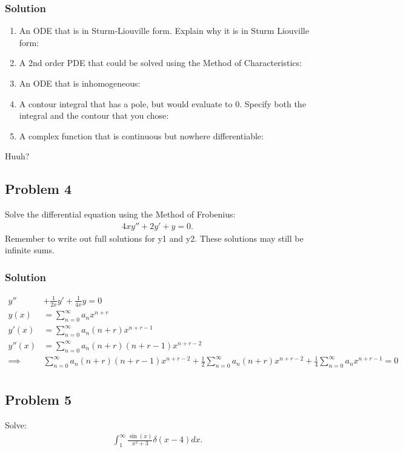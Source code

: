 \subsubsection*{Solution}
\begin{enumerate}
    \item An ODE that is in Sturm-Liouville form. Explain why it is in Sturm Liouville form:
    \item A 2nd order PDE that could be solved using the Method of Characteristics:
    \item An ODE that is inhomogeneous:
    \item A contour integral that has a pole, but would evaluate to 0. Specify both the integral and the contour that you chose:
    \item A complex function that is continuous but nowhere differentiable:
\end{enumerate}
\begin{center}
    Huuh?
\end{center}
\subsection*{Problem 4}
Solve the differential equation using the Method of Frobenius:
\begin{align*}
    4xy'' + 2y' +y = 0.
\end{align*}Remember to write out full solutions for y1 and y2. These solutions may still be infinite sums.

\subsubsection*{Solution}
\begin{align*}
    y'' &+ \frac{1}{2x}y' + \frac{1}{4x}y = 0\\
    y(x) &= \sum_{n=0}^\infty a_nx^{n + r}\\
    y'(x) &= \sum_{n=0}^\infty a_n(n+r)x^{n + r - 1}\\
    y''(x) &= \sum_{n=0}^\infty a_n(n+r)(n+r-1)x^{n + r - 2}\\
    \implies& \sum_{n=0}^\infty a_n(n+r)(n+r-1)x^{n + r - 2}+ \frac{1}{2}\sum_{n=0}^\infty a_n(n+r)x^{n + r - 2} + \frac{1}{4}\sum_{n=0}^\infty a_nx^{n + r - 1} = 0\\
\end{align*}

\subsection*{Problem 5}
Solve:
\begin{align*}
    \int_{1}^{\infty}\frac{\sin(x)}{x^2 + 3}\delta(x - 4)dx.
\end{align*}

